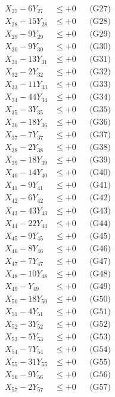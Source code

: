 \documentclass[a4paper,10pt]{article}
\begin{document}
{\begin{align}
X_{27} - 6Y_{27} &\leq +0 && \text{(G27)} \\
X_{28} - 15Y_{28} &\leq +0 && \text{(G28)} \\
X_{29} - 9Y_{29} &\leq +0 && \text{(G29)} \\
X_{30} - 9Y_{30} &\leq +0 && \text{(G30)} \\
X_{31} - 13Y_{31} &\leq +0 && \text{(G31)} \\
X_{32} - 2Y_{32} &\leq +0 && \text{(G32)} \\
X_{33} - 11Y_{33} &\leq +0 && \text{(G33)} \\
\allowbreak
X_{34} - 44Y_{34} &\leq +0 && \text{(G34)} \\
X_{35} - 3Y_{35} &\leq +0 && \text{(G35)} \\
X_{36} - 18Y_{36} &\leq +0 && \text{(G36)} \\
X_{37} - 7Y_{37} &\leq +0 && \text{(G37)} \\
X_{38} - 2Y_{38} &\leq +0 && \text{(G38)} \\
X_{39} - 18Y_{39} &\leq +0 && \text{(G39)} \\
X_{40} - 14Y_{40} &\leq +0 && \text{(G40)} \\
X_{41} - 9Y_{41} &\leq +0 && \text{(G41)} \\
X_{42} - 6Y_{42} &\leq +0 && \text{(G42)} \\
X_{43} - 43Y_{43} &\leq +0 && \text{(G43)} \\
\allowbreak
X_{44} - 22Y_{44} &\leq +0 && \text{(G44)} \\
X_{45} - 9Y_{45} &\leq +0 && \text{(G45)} \\
X_{46} - 8Y_{46} &\leq +0 && \text{(G46)} \\
X_{47} - 7Y_{47} &\leq +0 && \text{(G47)} \\
X_{48} - 10Y_{48} &\leq +0 && \text{(G48)} \\
X_{49} - Y_{49} &\leq +0 && \text{(G49)} \\
X_{50} - 18Y_{50} &\leq +0 && \text{(G50)} \\
X_{51} - 4Y_{51} &\leq +0 && \text{(G51)} \\
X_{52} - 3Y_{52} &\leq +0 && \text{(G52)} \\
X_{53} - 5Y_{53} &\leq +0 && \text{(G53)} \\
\allowbreak
X_{54} - 7Y_{54} &\leq +0 && \text{(G54)} \\
X_{55} - 31Y_{55} &\leq +0 && \text{(G55)} \\
X_{56} - 9Y_{56} &\leq +0 && \text{(G56)} \\
X_{57} - 2Y_{57} &\leq +0 && \text{(G57)} \\

\end{align}}
\end{document}
